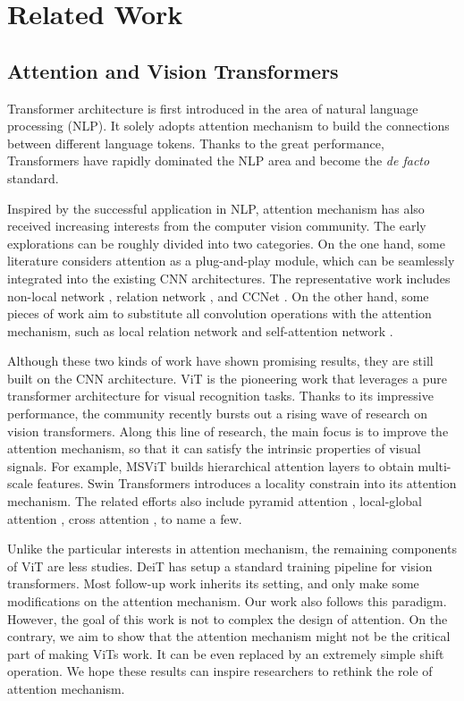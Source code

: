 \documentclass[letterpaper]{article} \usepackage{aaai22}  \usepackage{times}  \usepackage{helvet}  \usepackage{courier}  \usepackage[hyphens]{url}  \usepackage{graphicx} \usepackage{amsmath}
\begin{document}
\section{Related Work}

\subsection{Attention and Vision Transformers}

Transformer architecture \cite{AttentionAllYouNeed} is first introduced in the area of natural language processing (NLP). It solely adopts attention mechanism to build the connections between different language tokens. Thanks to the great performance, Transformers have rapidly dominated the NLP area and become the \textit{de facto} standard.

Inspired by the successful application in NLP, attention mechanism has also received increasing interests from the computer vision community. The early explorations can be roughly divided into two categories. On the one hand, some literature considers attention as a plug-and-play module, which can be seamlessly integrated into the existing CNN architectures. The representative work includes non-local network \cite{NonLocal}, relation network \cite{RelationNet}, and CCNet \cite{CCNet}. On the other hand, some pieces of work aim to substitute all convolution operations with the attention mechanism, such as local relation network \cite{LocalRelation} and self-attention network \cite{SANet}. 

Although these two kinds of work have shown promising results, they are still built on the CNN architecture. ViT \cite{ViT} is the pioneering work that leverages a pure transformer architecture for visual recognition tasks. Thanks to its impressive performance, the community recently bursts out a rising wave of research on vision transformers. Along this line of research, the main focus is to improve the attention mechanism, so that it can satisfy the intrinsic properties of visual signals. For example, MSViT \cite{MSViT} builds hierarchical attention layers to obtain multi-scale features. Swin Transformers \cite{Swin} introduces a locality constrain into its attention mechanism. The related efforts also include pyramid attention \cite{PVT}, local-global attention \cite{LocalGlobalTransformer}, cross attention \cite{CrossViT}, to name a few.

Unlike the particular interests in attention mechanism, the remaining components of ViT are less studies. DeiT \cite{DeiT} has setup a standard training pipeline for vision transformers. Most follow-up work inherits its setting, and only make some modifications on the attention mechanism. Our work also follows this paradigm. However, the goal of this work is not to complex the design of attention. On the contrary, we aim to show that the attention mechanism might not be the critical part of making ViTs work. It can be even replaced by an extremely simple shift operation. We hope these results can inspire researchers to rethink the role of attention mechanism. 
\end{document}
